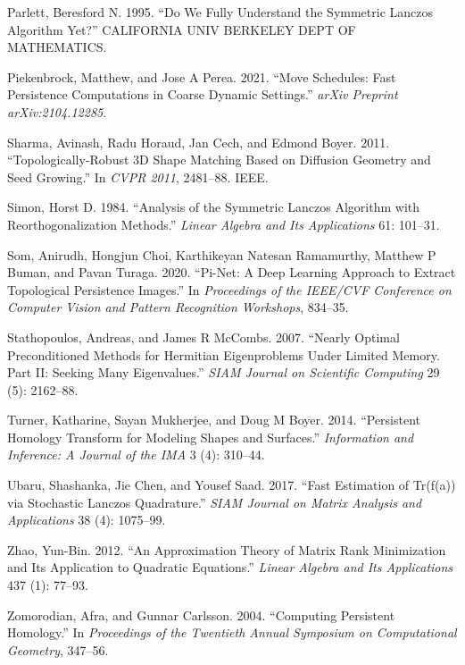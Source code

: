 \documentclass[
  letterpaper,
  DIV=11,
  numbers=noendperiod,
  oneside]{scrartcl}
\begin{document}
\begin{CSLReferences}
Parlett, Beresford N. 1995. {``Do We Fully Understand the Symmetric
Lanczos Algorithm Yet?''} CALIFORNIA UNIV BERKELEY DEPT OF MATHEMATICS.

Piekenbrock, Matthew, and Jose A Perea. 2021. {``Move Schedules: Fast
Persistence Computations in Coarse Dynamic Settings.''} \emph{arXiv
Preprint arXiv:2104.12285}.

Sharma, Avinash, Radu Horaud, Jan Cech, and Edmond Boyer. 2011.
{``Topologically-Robust 3D Shape Matching Based on Diffusion Geometry
and Seed Growing.''} In \emph{CVPR 2011}, 2481--88. IEEE.

Simon, Horst D. 1984. {``Analysis of the Symmetric Lanczos Algorithm
with Reorthogonalization Methods.''} \emph{Linear Algebra and Its
Applications} 61: 101--31.

Som, Anirudh, Hongjun Choi, Karthikeyan Natesan Ramamurthy, Matthew P
Buman, and Pavan Turaga. 2020. {``Pi-Net: A Deep Learning Approach to
Extract Topological Persistence Images.''} In \emph{Proceedings of the
IEEE/CVF Conference on Computer Vision and Pattern Recognition
Workshops}, 834--35.

Stathopoulos, Andreas, and James R McCombs. 2007. {``Nearly Optimal
Preconditioned Methods for Hermitian Eigenproblems Under Limited Memory.
Part II: Seeking Many Eigenvalues.''} \emph{SIAM Journal on Scientific
Computing} 29 (5): 2162--88.

Turner, Katharine, Sayan Mukherjee, and Doug M Boyer. 2014.
{``Persistent Homology Transform for Modeling Shapes and Surfaces.''}
\emph{Information and Inference: A Journal of the IMA} 3 (4): 310--44.

Ubaru, Shashanka, Jie Chen, and Yousef Saad. 2017. {``Fast Estimation of
Tr(f(a)) via Stochastic Lanczos Quadrature.''} \emph{SIAM Journal on
Matrix Analysis and Applications} 38 (4): 1075--99.

Zhao, Yun-Bin. 2012. {``An Approximation Theory of Matrix Rank
Minimization and Its Application to Quadratic Equations.''} \emph{Linear
Algebra and Its Applications} 437 (1): 77--93.

Zomorodian, Afra, and Gunnar Carlsson. 2004. {``Computing Persistent
Homology.''} In \emph{Proceedings of the Twentieth Annual Symposium on
Computational Geometry}, 347--56.

\end{CSLReferences}
\end{document}
